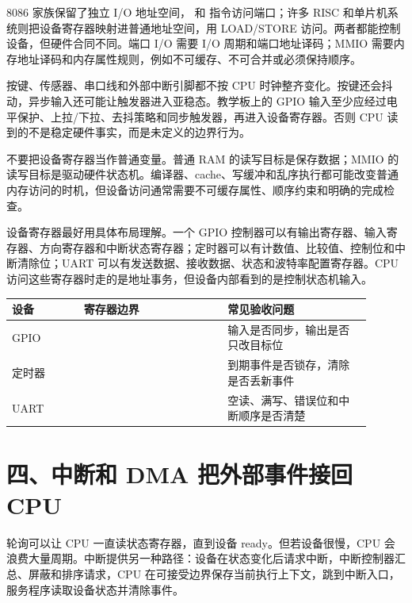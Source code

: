 8086 家族保留了独立 I/O 地址空间， 和  指令访问端口；许多 RISC 和单片机系统则把设备寄存器映射进普通地址空间，用 LOAD/STORE 访问。两者都能控制设备，但硬件合同不同。端口 I/O 需要 I/O 周期和端口地址译码；MMIO 需要内存地址译码和内存属性规则，例如不可缓存、不可合并或必须保持顺序。

按键、传感器、串口线和外部中断引脚都不按 CPU 时钟整齐变化。按键还会抖动，异步输入还可能让触发器进入亚稳态。教学板上的 GPIO 输入至少应经过电平保护、上拉/下拉、去抖策略和同步触发器，再进入设备寄存器。否则 CPU 读到的不是稳定硬件事实，而是未定义的边界行为。

\begin{warningbox}
不要把设备寄存器当作普通变量。普通 RAM 的读写目标是保存数据；MMIO 的读写目标是驱动硬件状态机。编译器、cache、写缓冲和乱序执行都可能改变普通内存访问的时机，但设备访问通常需要不可缓存属性、顺序约束和明确的完成检查。
\end{warningbox}

设备寄存器最好用具体布局理解。一个 GPIO 控制器可以有输出寄存器、输入寄存器、方向寄存器和中断状态寄存器；定时器可以有计数值、比较值、控制位和中断清除位；UART 可以有发送数据、接收数据、状态和波特率配置寄存器。CPU 访问这些寄存器时走的是地址事务，但设备内部看到的是控制状态机输入。

\begin{longtable}{L{0.18\linewidth}L{0.36\linewidth}L{0.36\linewidth}}
\toprule
设备 & 寄存器边界 & 常见验收问题 \\
\midrule
GPIO &  & 输入是否同步，输出是否只改目标位 \\
定时器 &  & 到期事件是否锁存，清除是否丢新事件 \\
UART &  & 空读、满写、错误位和中断顺序是否清楚 \\
\bottomrule
\end{longtable}

\section{四、中断和 DMA 把外部事件接回 CPU}

轮询可以让 CPU 一直读状态寄存器，直到设备 ready。但若设备很慢，CPU 会浪费大量周期。中断提供另一种路径：设备在状态变化后请求中断，中断控制器汇总、屏蔽和排序请求，CPU 在可接受边界保存当前执行上下文，跳到中断入口，服务程序读取设备状态并清除事件。

